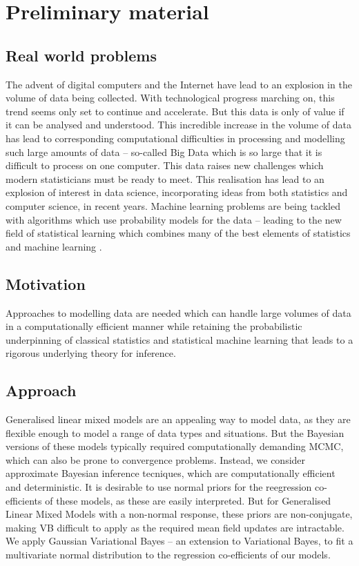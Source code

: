 \chapter{Preliminary material}

\section{Real world problems}

The advent of digital computers and the Internet have lead to an explosion in the volume of data being
collected. With technological progress marching on, this trend seems only set to continue and accelerate. But
this data is only of value if it can be analysed and understood.  This incredible increase in the volume of
data has lead to corresponding computational difficulties in processing and modelling such large amounts of
data -- so-called Big Data which is so large that it is difficult to process on one computer. This data raises
new challenges which modern statisticians must be ready to meet. This realisation has lead to an explosion of
interest in data science, incorporating ideas from both statistics and computer science, in recent years.
Machine learning problems are being tackled with algorithms which use probability models for the data --
leading to the new field of statistical learning which combines many of the best elements of statistics and
machine learning \citep{James:2014:ISL:2517747} \citep{MacKay:2002:ITI:971143}
\citep{hastie01statisticallearning} \citep{Murphy:2012:MLP:2380985}.

\section{Motivation}

Approaches to modelling data are needed which can handle large volumes of data in a computationally
efficient manner while retaining the probabilistic underpinning of classical statistics and statistical machine
learning that leads to a rigorous underlying theory for inference.

\section{Approach}

Generalised linear mixed models are an appealing way to model data, as they are flexible enough to model a
range of data types and situations. But the Bayesian versions of these models typically required 
computationally demanding MCMC, which can also be prone to convergence problems. Instead, we consider approximate Bayesian inference tecniques, which are computationally efficient and deterministic. It is
desirable to use normal priors for the reegression co-efficients of these models, as these are easily
interpreted. But for Generalised Linear Mixed Models with a non-normal response, these priors are
non-conjugate, making VB difficult to apply as the required mean field updates are intractable. We apply
Gaussian Variational Bayes -- an extension to Variational Bayes, to fit a multivariate normal distribution
to the regression co-efficients of our models.

